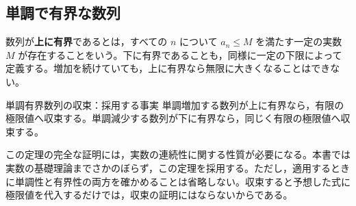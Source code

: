 \subsection{単調で有界な数列}
数列が\textbf{上に有界}であるとは，すべての $n$ について $a_n\le M$ を満たす一定の実数 $M$ が存在することをいう。下に有界であることも，同様に一定の下限によって定義する。増加を続けていても，上に有界なら無限に大きくなることはできない。

\begin{theorem}{単調有界数列の収束：採用する事実}
単調増加する数列が上に有界なら，有限の極限値へ収束する。単調減少する数列が下に有界なら，同じく有限の極限値へ収束する。
\end{theorem}

この定理の完全な証明には，実数の連続性に関する性質が必要になる。本書では実数の基礎理論までさかのぼらず，この定理を採用する。ただし，適用するときに単調性と有界性の両方を確かめることは省略しない。収束すると予想した式に極限値を代入するだけでは，収束の証明にはならないからである。

